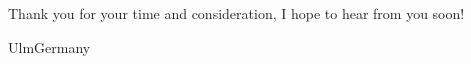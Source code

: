\documentclass[12pt,a4paper,sans]{moderncv}        %
\begin{document}
	
	Thank you for your time and consideration, I hope to hear from you soon!
	
	\title{}
	\address{Bismarckring, 64}{Ulm}{Germany}
	\makeletterclosing
	\name{}{}
\end{document}
